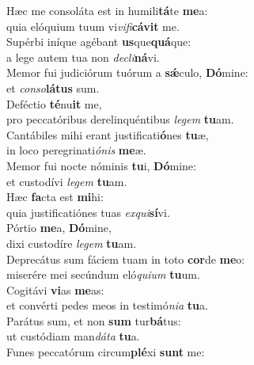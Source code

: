 \evenverse Hæc me consoláta est in humili\textbf{tá}te \textbf{me}a:~\*\\
\evenverse quia elóquium tuum vi\textit{vi}\textit{fi}\textbf{cá}\textbf{vit} me.\\
\oddverse Supérbi iníque agébant \textbf{us}que\textbf{quá}que:~\*\\
\oddverse a lege autem tua non \textit{de}\textit{cli}\textbf{ná}vi.\\
\evenverse Memor fui judiciórum tuórum a \textbf{sǽ}culo, \textbf{Dó}mine:~\*\\
\evenverse et \textit{con}\textit{so}\textbf{lá}\textbf{tus} sum.\\
\oddverse Deféctio \textbf{té}nu\textbf{it} me,~\*\\
\oddverse pro peccatóribus derelinquéntibus \textit{le}\textit{gem} \textbf{tu}am.\\
\evenverse Cantábiles mihi erant justificati\textbf{ó}nes \textbf{tu}æ,~\*\\
\evenverse in loco peregrinati\textit{ó}\textit{nis} \textbf{me}æ.\\
\oddverse Memor fui nocte nóminis \textbf{tu}i, \textbf{Dó}mine:~\*\\
\oddverse et custodívi \textit{le}\textit{gem} \textbf{tu}am.\\
\evenverse Hæc \textbf{fa}cta est \textbf{mi}hi:~\*\\
\evenverse quia justificatiónes tuas \textit{ex}\textit{qui}\textbf{sí}vi.\\
\oddverse Pórtio \textbf{me}a, \textbf{Dó}mine,~\*\\
\oddverse dixi custodíre \textit{le}\textit{gem} \textbf{tu}am.\\
\evenverse Deprecátus sum fáciem tuam in toto \textbf{cor}de \textbf{me}o:~\*\\
\evenverse miserére mei secúndum eló\textit{qui}\textit{um} \textbf{tu}um.\\
\oddverse Cogitávi \textbf{vi}as \textbf{me}as:~\*\\
\oddverse et convérti pedes meos in testimó\textit{ni}\textit{a} \textbf{tu}a.\\
\evenverse Parátus sum, et non \textbf{sum} tur\textbf{bá}tus:~\*\\
\evenverse ut custódiam man\textit{dá}\textit{ta} \textbf{tu}a.\\
\oddverse Funes peccatórum circum\textbf{plé}xi \textbf{sunt} me:~\*\\
